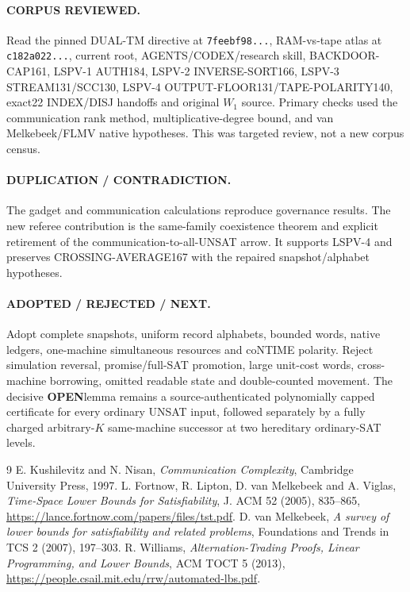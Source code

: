 \documentclass[11pt]{article}
\newcommand{\OPEN}{\textbf{OPEN}}
\begin{document}
\paragraph{CORPUS REVIEWED.}
Read the pinned DUAL-TM directive at \texttt{7feebf98...}, RAM-vs-tape atlas at \texttt{c182a022...}, current root, AGENTS/CODEX/research skill, BACKDOOR-CAP161, LSPV-1 AUTH184, LSPV-2 INVERSE-SORT166, LSPV-3 STREAM131/SCC130, LSPV-4 OUTPUT-FLOOR131/TAPE-POLARITY140, exact22 INDEX/DISJ handoffs and original \(W_1\) source. Primary checks used the communication rank method, multiplicative-degree bound, and van Melkebeek/FLMV native hypotheses. This was targeted review, not a new corpus census.

\paragraph{DUPLICATION / CONTRADICTION.}
The gadget and communication calculations reproduce governance results. The new referee contribution is the same-family coexistence theorem and explicit retirement of the communication-to-all-UNSAT arrow. It supports LSPV-4 and preserves CROSSING-AVERAGE167 with the repaired snapshot/alphabet hypotheses.

\paragraph{ADOPTED / REJECTED / NEXT.}
Adopt complete snapshots, uniform record alphabets, bounded words, native ledgers, one-machine simultaneous resources and coNTIME polarity. Reject simulation reversal, promise/full-SAT promotion, large unit-cost words, cross-machine borrowing, omitted readable state and double-counted movement. The decisive \OPEN lemma remains a source-authenticated polynomially capped certificate for every ordinary UNSAT input, followed separately by a fully charged arbitrary-\(K\) same-machine successor at two hereditary ordinary-SAT levels.

\begin{thebibliography}{9}\small
{} E. Kushilevitz and N. Nisan, \emph{Communication Complexity}, Cambridge University Press, 1997.
 L. Fortnow, R. Lipton, D. van Melkebeek and A. Viglas, \emph{Time-Space Lower Bounds for Satisfiability}, J. ACM 52 (2005), 835--865, \url{https://lance.fortnow.com/papers/files/tst.pdf}.
 D. van Melkebeek, \emph{A survey of lower bounds for satisfiability and related problems}, Foundations and Trends in TCS 2 (2007), 197--303.
 R. Williams, \emph{Alternation-Trading Proofs, Linear Programming, and Lower Bounds}, ACM TOCT 5 (2013), \url{https://people.csail.mit.edu/rrw/automated-lbs.pdf}.
\end{thebibliography}
\end{document}

